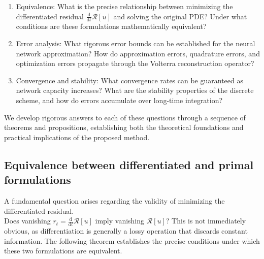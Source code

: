 \documentclass[11pt,reqno]{amsart}
\theoremstyle{plain}
\theoremstyle{definition}
\theoremstyle{remark}
\begin{document}
\begin{enumerate}
    \item {Equivalence:} What is the precise relationship between minimizing the differentiated residual $\displaystyle \frac{\mathrm{d}}{\mathrm{d}t}\mathcal{R}[u]$ and solving the original PDE? Under what conditions are these formulations mathematically equivalent?
    
    \item {Error analysis:} What rigorous error bounds can be established for the neural network approximation? How do approximation errors, quadrature errors, and optimization errors propagate through the Volterra reconstruction operator?
    
    \item {Convergence and stability:} What convergence rates can be guaranteed as network capacity increases? What are the stability properties of the discrete scheme, and how do errors accumulate over long-time integration?
\end{enumerate}
We develop rigorous answers to each of these questions through a sequence of theorems and propositions, establishing both the theoretical foundations and practical implications of the proposed method.

\subsection{Equivalence between differentiated and primal formulations}

A fundamental question arises regarding the validity of minimizing the differentiated residual. \\Does vanishing $\displaystyle r_t = \frac{\mathrm{d}}{ \mathrm{d}t}\mathcal{R}[u]$ imply vanishing $\mathcal{R}[u]$? This is not immediately obvious, as differentiation is generally a lossy operation that discards constant information. The following theorem establishes the precise conditions under which these two formulations are equivalent.
\end{document}
